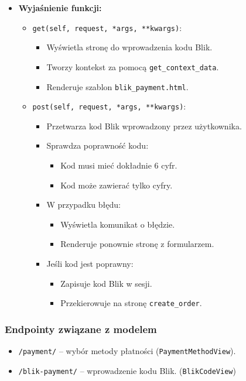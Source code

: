 \documentclass[12pt,a4paper,oneside]{article}
\theoremstyle{definition}
\numberwithin{equation}{section}
\begin{document}
\begin{itemize}
    \item \textbf{Wyjaśnienie funkcji:}
    \begin{itemize}
        \item \texttt{get(self, request, *args, **kwargs)}:
        \begin{itemize}
            \item Wyświetla stronę do wprowadzenia kodu Blik.
            \item Tworzy kontekst za pomocą \texttt{get\_context\_data}.
            \item Renderuje szablon \texttt{blik\_payment.html}.
        \end{itemize}
        \item \texttt{post(self, request, *args, **kwargs)}:
        \begin{itemize}
            \item Przetwarza kod Blik wprowadzony przez użytkownika.
            \item Sprawdza poprawność kodu:
            \begin{itemize}
                \item Kod musi mieć dokładnie 6 cyfr.
                \item Kod może zawierać tylko cyfry.
            \end{itemize}
            \item W przypadku błędu:
            \begin{itemize}
                \item Wyświetla komunikat o błędzie.
                \item Renderuje ponownie stronę z formularzem.
            \end{itemize}
            \item Jeśli kod jest poprawny:
            \begin{itemize}
                \item Zapisuje kod Blik w sesji.
                \item Przekierowuje na stronę \texttt{create\_order}.
            \end{itemize}
        \end{itemize}
    \end{itemize}
\end{itemize}


\subsubsection*{Endpointy związane z modelem}
\begin{itemize}
    \item \texttt{/payment/} – wybór metody płatności (\texttt{PaymentMethodView}).
    \item \texttt{/blik-payment/} – wprowadzenie kodu Blik. (\texttt{BlikCodeView})
\end{itemize}
\end{document}
